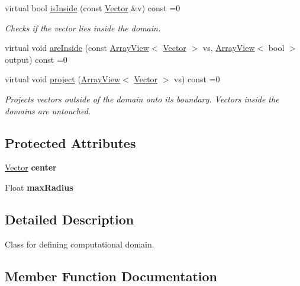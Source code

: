 \begin{DoxyCompactItemize}
virtual bool \hyperlink{classAbstract_1_1Domain_ac562e4b29568a1572b01853d5809e87f}{is\+Inside} (const \hyperlink{classBasicVector}{Vector} \&v) const =0
\begin{DoxyCompactList}\small\item\em Checks if the vector lies inside the domain. \end{DoxyCompactList}\item 
virtual void \hyperlink{classAbstract_1_1Domain_a48ecb4ac3dab5f5a5e2de7b8e8218317}{are\+Inside} (const \hyperlink{classArrayView}{Array\+View}$<$ \hyperlink{classBasicVector}{Vector} $>$ vs, \hyperlink{classArrayView}{Array\+View}$<$ bool $>$ output) const =0
\item 
\hypertarget{classAbstract_1_1Domain_a25ad605750373faf0ade3d197187bc16}{}\label{classAbstract_1_1Domain_a25ad605750373faf0ade3d197187bc16} 
virtual void \hyperlink{classAbstract_1_1Domain_a25ad605750373faf0ade3d197187bc16}{project} (\hyperlink{classArrayView}{Array\+View}$<$ \hyperlink{classBasicVector}{Vector} $>$ vs) const =0
\begin{DoxyCompactList}\small\item\em Projects vectors outside of the domain onto its boundary. Vectors inside the domains are untouched. \end{DoxyCompactList}\end{DoxyCompactItemize}
\subsection*{Protected Attributes}
\begin{DoxyCompactItemize}
\item 
\hypertarget{classAbstract_1_1Domain_adc24a9392e0afc760beb51502baa9c0b}{}\label{classAbstract_1_1Domain_adc24a9392e0afc760beb51502baa9c0b} 
\hyperlink{classBasicVector}{Vector} {\bfseries center}
\item 
\hypertarget{classAbstract_1_1Domain_afe14973fe813d9c5ec25927faf1873f7}{}\label{classAbstract_1_1Domain_afe14973fe813d9c5ec25927faf1873f7} 
Float {\bfseries max\+Radius}
\end{DoxyCompactItemize}


\subsection{Detailed Description}
Class for defining computational domain. 

\subsection{Member Function Documentation}
\hypertarget{classAbstract_1_1Domain_a48ecb4ac3dab5f5a5e2de7b8e8218317}{}\label{classAbstract_1_1Domain_a48ecb4ac3dab5f5a5e2de7b8e8218317} 
